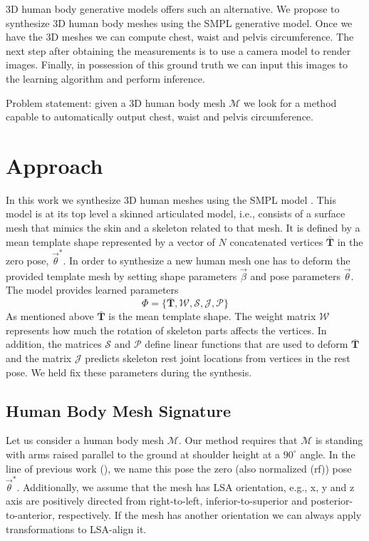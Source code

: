 \documentclass[10pt,twocolumn,letterpaper]{article}
\begin{document}
3D human body generative models offers such an alternative. We propose to 
synthesize 3D human body meshes using the SMPL \cite{Loper.2015} generative 
model. Once we have 
the 3D meshes we can compute chest, waist and pelvis circumference. The next 
step after obtaining the 
measurements is to use a camera model to render
images. Finally, in possession of this ground truth we can 
input this images to the learning algorithm and perform inference.

Problem statement: given a 3D human body mesh $\mathcal{M}$ we look for a 
method capable to automatically output chest, waist and pelvis circumference.

\section{Approach}\label{sec:approach}

In this work we synthesize 3D human meshes using the SMPL
model \cite{Loper.2015}. This model is at its top level a skinned articulated 
model, i.e., 
consists of a 
surface mesh that mimics the skin and a skeleton related to that mesh. It is 
defined by a mean 
template shape represented by a vector of $N$ concatenated vertices 
$\mathbf{\bar{T}}$ in the zero pose, $\vec{\theta}^*$. In order 
to 
synthesize a 
new human mesh one has to deform the provided template mesh by 
setting shape parameters $\vec{\beta}$ and pose parameters $\vec{\theta}$. The 
model provides learned parameters
\begin{equation} \label{eq:smpl_params}
\Phi = \{\mathbf{\bar{T}}, \mathcal{W}, \mathcal{S}, \mathcal{J}, 
\mathcal{P}\}
\end{equation}
As mentioned above $\mathbf{\bar{T}}$ is the mean template shape. The weight 
matrix $\mathcal{W}$ represents how much the rotation of skeleton parts affects 
the vertices. In addition, the matrices $\mathcal{S}$ and $\mathcal{P}$ define 
linear functions that are used to deform $\mathbf{\bar{T}}$ and the matrix 
$\mathcal{J}$ predicts skeleton rest joint locations from vertices in the rest 
pose. We held fix these parameters during the synthesis.

\subsection{Human Body Mesh Signature}\label{subsec:hbm_signature}
Let us consider a human body mesh $\mathcal{M}$. Our method requires that 
$\mathcal{M}$ is standing with arms raised 
parallel to the 
ground at shoulder height at a $90^\circ$ angle. In the line 
of previous work (\cite{Dibra.2016a}), we name this pose the zero (also 
normalized (rf)) pose $\vec{\theta}^*$. Additionally, we assume that the mesh 
has LSA orientation, e.g., x, y and z axis are positively directed from 
right-to-left, inferior-to-superior and posterior-to-anterior, respectively. If 
the mesh has another orientation we can always apply transformations to 
LSA-align it.
\end{document}
